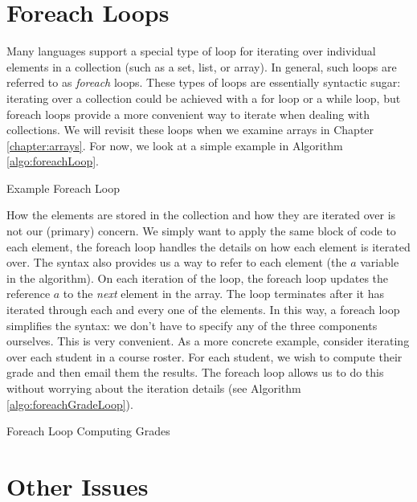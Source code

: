 \section{Foreach Loops}

Many languages support a special type of loop for iterating over individual elements in 
a collection (such as a set, list, or array).  In general, such loops are referred to as \emph{foreach}
loops.  These types of loops are essentially \gls{syntactic sugar}: iterating over a collection
could be achieved with a for loop or a while loop, but foreach loops provide a more
convenient way to iterate when dealing with collections.  We will revisit these loops
when we examine arrays in Chapter \ref{chapter:arrays}.  For now, we look at a simple example
in Algorithm \ref{algo:foreachLoop}.

\begin{algorithm}[h]
\caption{Example Foreach Loop}
\label{algo:foreachLoop}
\end{algorithm}

How the elements are stored in the collection and how they are iterated over is not our 
(primary) concern.  We simply want to apply the same block of code to each element, 
the foreach loop handles the details on how each element is iterated over.  The syntax
also provides us a way to refer to each element (the $a$ variable in the algorithm).  On
each iteration of the loop, the foreach loop updates the reference $a$ to the \emph{next}
element in the array.  The loop terminates after it has iterated through each and every
one of the elements.  In this way, a foreach loop simplifies the syntax: we don't have to 
specify any of the three components ourselves.  This is very convenient.  As a more
concrete example, consider iterating over each student in a course roster.  For each
student, we wish to compute their grade and then email them the results.  The foreach
loop allows us to do this without worrying about the iteration details (see Algorithm 
\ref{algo:foreachGradeLoop}).

\begin{algorithm}[h]
\caption{Foreach Loop Computing Grades}
\label{algo:foreachGradeLoop}
\end{algorithm}

\section{Other Issues}

